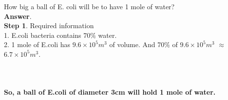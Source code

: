 \documentclass[11pt]{exam}
\begin{document}
\begin{questions}
\question
\label{Q14:E.coli and water}
How big a ball of E. coli will be to have 1 mole of water? \\
\textbf{Answer}. \\
\textbf{Step 1}. Required information \\
                1. E.coli bacteria contains 70$\%$ water. \\
                2. 1 mole of E.coli has $9.6\times10^{5}m^{3}$ of volume. And 70$\%$ of                 $9.6\times10^{5}m^{3}$ $\approx$ $6.7\times10^{5}m^{3}$. \\
                \\
 \\ \\
                 \textbf{So, a ball of E.coli of diameter 3cm will hold 1 mole of water.} \\ \\ \\ \\ \\ \\ \\ \\



\end{questions}
\end{document}
